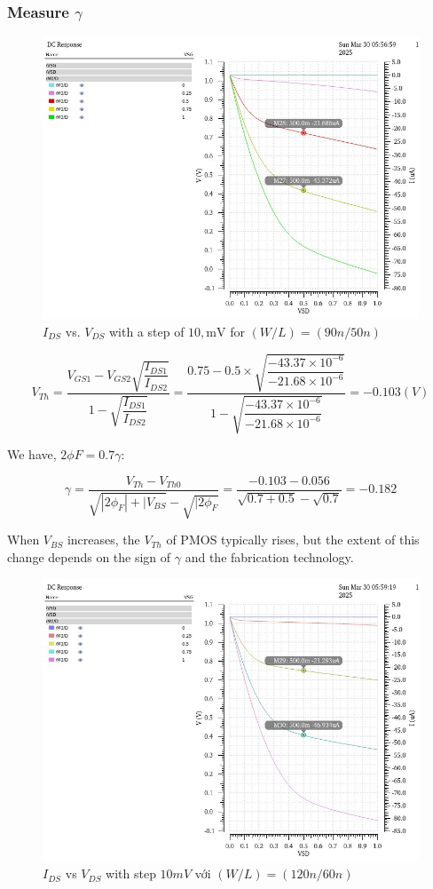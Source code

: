 \subsubsection{Measure $\gamma$}


\begin{figure}[H]
	\centering
	\includegraphics[width=.6\linewidth]{sections/pic/EX3_PMOS_gamma_(w_l)(90_50).png}
	\caption{$I_{DS}$ vs. $V_{DS}$ with a step of $10,\text{mV}$ for $(W/L) = (90n/50n)$}
	\label{f_EX3_PMOS_gamma_(w_l)(90_50)}
\end{figure}

\[ V_{Th} = \dfrac{V_{GS1} - V_{GS2}\sqrt{\dfrac{I_{DS1}}{I_{DS2}}}}{1 - \sqrt{\dfrac{I_{DS1}}{I_{DS2}}}} = \dfrac{0.75 - 0.5\times \sqrt{\dfrac{-43.37\times 10^{-6}}{-21.68\times 10^{-6}}}}{1 - \sqrt{\dfrac{-43.37\times 10^{-6}}{-21.68\times 10^{-6}}}} = -0.103(V)\] 


We have, $2\phi F = 0.7 \gamma$:

\[ \gamma = \dfrac{V_{Th} - V_{Th0}}{\sqrt{|2\phi_{F}| + |V_{BS} } - \sqrt{|2\phi_{F}}} = \dfrac{-0.103 - 0.056}{\sqrt{0.7 + 0.5} - \sqrt{0.7}} =-0.182 \]

When $V_{BS}$ increases, the $V_{Th}$ of PMOS typically rises, but the extent of this change depends on the sign of $\gamma$ and the fabrication technology.\\


\begin{figure}[H]
	\centering
	\includegraphics[width=.6\linewidth]{sections/pic/EX3_PMOS_gamma_(w_l)(120_60).png}
	\caption{$I_{DS}$ vs $V_{DS}$ with step $10mV$ với $(W/L) = (120n/60n)$}
	\label{f_EX3_PMOS_gamma_(w_l)(120_60)}
\end{figure}

